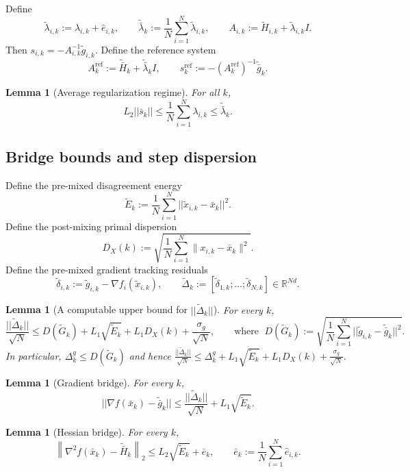 \documentclass[11pt,a4paper]{article}
\def\norm#1{||#1||}%
\newtheorem{lemma}[theorem]{Lemma}
\newcommand{\R}{\mathbb{R}}
\newcommand{\norm}[1]{\left\|#1\right\|}
\newcommand{\normtwo}[1]{\left\|#1\right\|_2}
\begin{document}
	Define
	\[
	\tilde\lambda_{i,k}:=\lambda_{i,k}+\hat e_{i,k},\qquad
	\tilde{\bar\lambda}_k:=\frac1N\sum_{i=1}^N\tilde\lambda_{i,k},\qquad
	A_{i,k}:=\tilde H_{i,k}+\tilde\lambda_{i,k}I.
	\]
	Then $s_{i,k}=-A_{i,k}^{-1}\tilde g_{i,k}$.
	Define the reference system
	\[
	A_k^{\mathrm{ref}}:=\tilde{\bar H}_k+\tilde{\bar\lambda}_k I,\qquad
	s_k^{\mathrm{ref}}:=-(A_k^{\mathrm{ref}})^{-1}\tilde{\bar g}_k.
	\]
	
	\begin{lemma}[Average regularization regime]\label{lem:avg-regime}
		For all $k$,
		\[
		L_2\norm{\bar s_k}\le \frac1N\sum_{i=1}^N \lambda_{i,k}\le \tilde{\bar\lambda}_k.
		\]
	\end{lemma}
	
	\subsection{Bridge bounds and step dispersion}
	Define the pre-mixed disagreement energy
	\[
	\tilde E_k:=\frac{1}{N}\sum_{i=1}^N \norm{\tilde x_{i,k}-\bar x_k}^2.
	\]
	Define the post-mixing primal dispersion
	\[
	D_X(k):=\sqrt{\frac1N\sum_{i=1}^N \|x_{i,k}-\bar x_k\|^2}.
	\]
	Define the pre-mixed gradient tracking residuals
	\[
	\tilde\delta_{i,k}:=\tilde g_{i,k}-\nabla f_i(\tilde x_{i,k}),\qquad
	\tilde\Delta_k:=[\tilde\delta_{1,k};\dots;\tilde\delta_{N,k}]\in\R^{Nd}.
	\]
	
	
\begin{lemma}[A computable upper bound for $\norm{\tilde\Delta_k}$]\label{lem:tildeDelta-upper}
	For every $k$,
	\[
	\frac{\norm{\tilde\Delta_k}}{\sqrt N}
	\le D(\tilde G_k) + L_1\sqrt{\tilde E_k} + L_1 D_X(k) + \frac{\sigma_g}{\sqrt N},
	\qquad\text{where }\;D(\tilde G_k):=\sqrt{\frac1N\sum_{i=1}^N\norm{\tilde g_{i,k}-\tilde{\bar g}_k}^2}.
	\]
	In particular, $\Delta^g_k\le D(\tilde G_k)$ and hence
	$\frac{\norm{\tilde\Delta_k}}{\sqrt N}\le \Delta^g_k + L_1\sqrt{\tilde E_k} + L_1 D_X(k) + \frac{\sigma_g}{\sqrt N}$.
\end{lemma}
	
	\begin{lemma}[Gradient bridge]\label{lem:bridge-grad}
		For every $k$,
		\[
		\norm{\nabla f(\bar x_k)-\tilde{\bar g}_k}
		\le \frac{\norm{\tilde\Delta_k}}{\sqrt N}+L_1\sqrt{\tilde E_k}.
		\]
	\end{lemma}
	
	\begin{lemma}[Hessian bridge]\label{lem:bridge-hess}
		For every $k$,
		\[
		\normtwo{\nabla^2 f(\bar x_k)-\tilde{\bar H}_k}
		\le L_2\sqrt{\tilde E_k}+\bar e_k,\qquad
		\bar e_k:=\frac1N\sum_{i=1}^N \hat e_{i,k}.
		\]
	\end{lemma}
	
\end{document}
